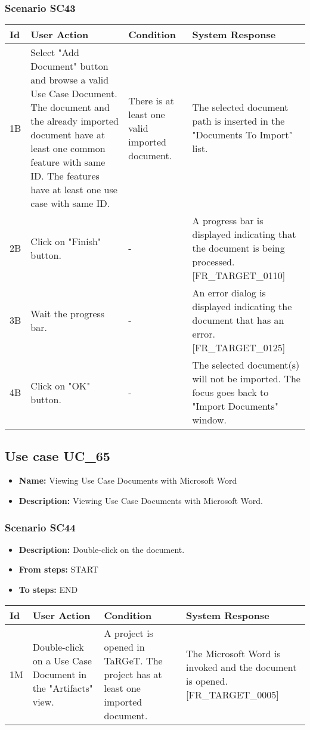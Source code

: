 \documentclass[a4paper,11pt]{article}
\newcommand{\bl}{\\ \hline}
\begin{document}
\subsubsection*{Scenario SC43}
\begin{tabular}{|p{0.4in}|p{1.5in}|p{1.5in}|p{1.5in}|}
\hline
Id & User Action & Condition & System Response \bl 
1B & Select "Add Document" button and browse a valid Use Case
						Document. The document and the already imported document have at
						least one common feature with same ID. The features have at least
						one use case with same ID. & There is at least one valid imported document.
					 & The selected document path is inserted in the "Documents
						To Import" list.\bl
2B & Click on "Finish" button. & - & A progress bar is displayed indicating that the document
						is being processed. [FR_TARGET_0110]\bl
3B & Wait the progress bar. & - & An error dialog is displayed indicating the document that
						has an error. [FR_TARGET_0125] \bl
4B & Click on "OK" button. & - & The selected document(s) will not be imported. The focus
						goes back to "Import Documents" window.\bl
\end{tabular}
\subsection*{Use case UC_65}
\begin{itemize}
\item {\bf Name: }Viewing Use Case Documents with Microsoft Word
\item {\bf Description: } Viewing Use Case Documents with Microsoft Word.
			
\end{itemize}
\subsubsection*{Scenario SC44}
\begin{itemize}
\item {\bf Description:} Double-click on the document.
\item {\bf From steps:} START
\item {\bf To steps:} END
\end{itemize}
\begin{tabular}{|p{0.4in}|p{1.5in}|p{1.5in}|p{1.5in}|}
\hline
Id & User Action & Condition & System Response \bl 
1M & Double-click on a Use Case Document in the "Artifacts"
						view.  & A project is opened in TaRGeT. The project has at least
						one imported document. & The Microsoft Word is invoked and the document is opened.
						[FR_TARGET_0005]\bl
\end{tabular}
\end{document}
